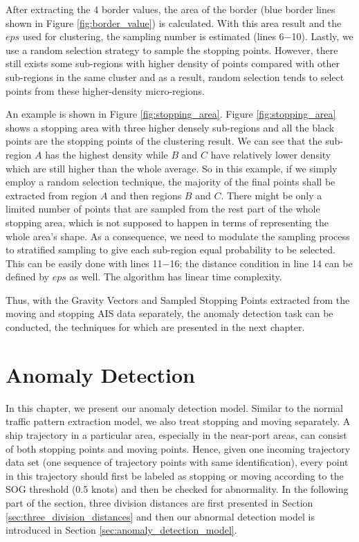 \documentclass[12pt,glossary]{dalcsthesis}
\begin{document}
After extracting the 4 border values, the area of the border (blue border lines shown in Figure \ref{fig:border_value}) is calculated. With this area result and the $eps$ used for clustering, the sampling number is estimated (lines 6$-$10). Lastly, we use a random selection strategy to sample the stopping points. However, there still exists some sub-regions with higher density of points compared with other sub-regions in the same cluster and as a result,  random selection tends to select points from these higher-density micro-regions. 

An example is shown in Figure \ref{fig:stopping_area}. Figure \ref{fig:stopping_area} shows a stopping area with three higher densely sub-regions and all the black points are the stopping points of the clustering result. We can see that the sub-region $A$ has the highest density while $B$ and $C$ have relatively lower density which are still higher than the whole average. So in this example, if we simply employ a random selection technique, the majority of the final points shall be extracted from region $A$ and then regions $B$ and $C$. There might be only a limited number of points that are sampled from the rest part of the whole stopping area, which is not supposed to happen in terms of representing the whole area's shape.  As a consequence, we need to modulate the  sampling process to stratified sampling to give each sub-region equal probability to be selected. This can be easily done with lines 11$-$16; the distance condition in line 14 can be defined by $eps$ as well. The algorithm has linear time complexity.

Thus, with the Gravity Vectors and Sampled Stopping Points extracted from the moving and stopping AIS data separately, the anomaly detection task can be conducted, the techniques for which are presented in the next chapter.



\chapter{Anomaly Detection}
\label{ch:anomaly_detection}

In this chapter, we present our anomaly detection model. Similar to the normal traffic pattern extraction model, we also treat stopping and moving separately. A ship trajectory in a particular area, especially in the near-port areas, can consist of both stopping points and moving points. Hence, given one incoming trajectory data set (one sequence of trajectory points with same identification), every point in this trajectory should first be labeled as stopping or moving according to the SOG threshold (0.5 knots) and then be checked for abnormality.  In the following part of the section, three division distances are first presented in Section \ref{sec:three_division_distances} and then our abnormal detection model is introduced in Section \ref{sec:anomaly_detection_model}.
\end{document}
